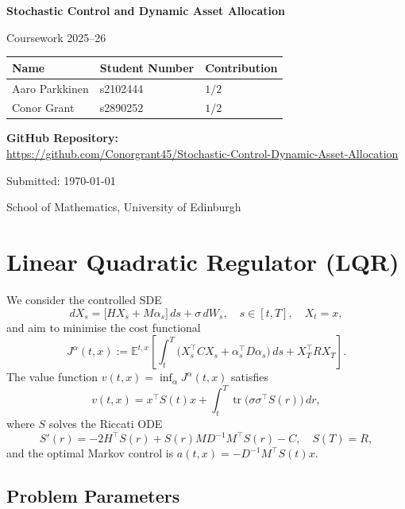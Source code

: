 \documentclass[12pt, a4paper]{article}
\newcommand{\E}{\mathbb{E}}
\newcommand{\tr}{\operatorname{tr}}
\begin{document}
\begin{titlepage}
    \centering
    \vspace*{2cm}
    {\LARGE \textbf{Stochastic Control and Dynamic Asset Allocation} \par}
    \vspace{0.5cm}
    {\Large Coursework 2025--26 \par}
    \vspace{2cm}
    {\large
    \begin{tabular}{lll}
        \toprule
        \textbf{Name} & \textbf{Student Number} & \textbf{Contribution} \\
        \midrule
        Aaro Parkkinen & s2102444 &  $1/2$ \\
        Conor Grant & s2890252 &  $1/2$ \\
        \bottomrule
    \end{tabular}
    \par}
    \vspace{2cm}
    {\large \textbf{GitHub Repository:} \\[0.4em]
    \url{https://github.com/Conorgrant45/Stochastic-Control-Dynamic-Asset-Allocation} \par}
    \vspace{1cm}
    {\large Submitted: \today \par}
    \vfill
    {\normalsize School of Mathematics, University of Edinburgh}
\end{titlepage}


\tableofcontents
\newpage

\section{Linear Quadratic Regulator (LQR)}
\label{sec:lqr}

We consider the controlled SDE
\[
    dX_s = \bigl[HX_s + M\alpha_s\bigr]\,ds + \sigma\,dW_s,
    \quad s \in [t, T],\quad X_t = x,
\]
and aim to minimise the cost functional
\[
    J^\alpha(t,x) := \E^{t,x}\!\left[
        \int_t^T \!\bigl(X_s^\top C X_s + \alpha_s^\top D\alpha_s\bigr)\,ds
        + X_T^\top R X_T
    \right].
\]
The value function $v(t,x) = \inf_\alpha J^\alpha(t,x)$ satisfies
\[
    v(t,x) = x^\top S(t)x + \int_t^T \tr\!\bigl(\sigma\sigma^\top S(r)\bigr)\,dr,
\]
where $S$ solves the Riccati ODE
\[
    S'(r) = -2H^\top S(r) + S(r)MD^{-1}M^\top S(r) - C,
    \quad S(T) = R,
\]
and the optimal Markov control is $a(t,x) = -D^{-1}M^\top S(t)x$.

\subsection{Problem Parameters}
\label{subsec:params}
\end{document}
